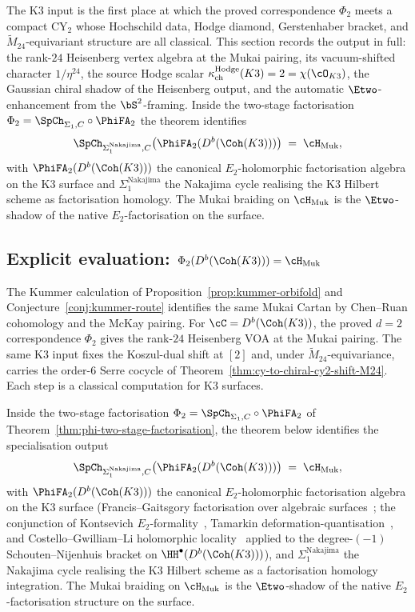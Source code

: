 The K3 input is the first place at which the proved correspondence $\Phi_2$ meets a compact CY$_2$ whose Hochschild data, Hodge diamond, Gerstenhaber bracket, and $\widetilde{M}_{24}$-equivariant structure are all classical. This section records the output in full: the rank-$24$ Heisenberg vertex algebra at the Mukai pairing, its vacuum-shifted character $1/\eta^{24}$, the source Hodge scalar $\kappa_{\mathrm{ch}}^{\mathrm{Hodge}}(K3) = 2 = \chi(\cO_{K3})$, the Gaussian chiral shadow of the Heisenberg output, and the automatic $\Etwo$-enhancement from the $\bS^2$-framing. Inside the two-stage factorisation $\Phi_2 = \SpCh_{\Sigma_1, C} \circ \PhiFA_2$ the theorem identifies
\[
 \SpCh_{\Sigma_1^{\mathrm{Nakajima}}, C}\bigl(\PhiFA_2(D^b(\Coh(K3)))\bigr) \;=\; \cH_{\mathrm{Muk}},
\]
with $\PhiFA_2(D^b(\Coh(K3)))$ the canonical $E_2$-holomorphic factorisation algebra on the K3 surface and $\Sigma_1^{\mathrm{Nakajima}}$ the Nakajima cycle realising the K3 Hilbert scheme as factorisation homology. The Mukai braiding on $\cH_{\mathrm{Muk}}$ is the $\Etwo$-shadow of the native $E_2$-factorisation on the surface.

\subsection{Explicit evaluation: \texorpdfstring{$\Phi_2(D^b(\Coh(K3))) = \cH_{\mathrm{Muk}}$}{Phi-2(D-b(Coh(K3))) = H-Muk}}
\label{subsec:phi-k3-explicit}

The Kummer calculation of Proposition~\ref{prop:kummer-orbifold} and
Conjecture~\ref{conj:kummer-route} identifies the same Mukai Cartan by
Chen--Ruan cohomology and the McKay pairing.  For
\(\cC = D^b(\Coh(K3))\), the proved \(d=2\) correspondence
\(\Phi_2\) gives the rank-\(24\) Heisenberg VOA at the Mukai pairing.
The same K3 input fixes the Koszul-dual shift at \([2]\) and, under
\(\widetilde{M}_{24}\)-equivariance, carries the order-\(6\) Serre
cocycle of Theorem~\ref{thm:cy-to-chiral-cy2-shift-M24}.  Each step is
a classical computation for K3 surfaces.

Inside the two-stage factorisation $\Phi_2 = \SpCh_{\Sigma_1, C} \circ \PhiFA_2$ of Theorem~\ref{thm:phi-two-stage-factorisation}, the theorem below identifies the specialisation output
\[
 \SpCh_{\Sigma_1^{\mathrm{Nakajima}}, C}\bigl(\PhiFA_2(D^b(\Coh(K3)))\bigr) \;=\; \cH_{\mathrm{Muk}},
\]
with $\PhiFA_2(D^b(\Coh(K3)))$ the canonical $E_2$-holomorphic factorisation algebra on the K3 surface (Francis--Gaitsgory factorisation over algebraic surfaces~\cite{FrancisGaitsgory2012}; the conjunction of Kontsevich $E_2$-formality~\cite{Kontsevich1999}, Tamarkin deformation-quantisation~\cite{Tamarkin2007}, and Costello--Gwilliam--Li holomorphic locality~\cite{CostelloGwilliam2017,CostelloLi2016,CostelloLi2020} applied to the degree-$(-1)$ Schouten--Nijenhuis bracket on $\HH^\bullet(D^b(\Coh(K3)))$), and $\Sigma_1^{\mathrm{Nakajima}}$ the Nakajima cycle realising the K3 Hilbert scheme as a factorisation homology integration. The Mukai braiding on $\cH_{\mathrm{Muk}}$ is the $\Etwo$-shadow of the native $E_2$-factorisation structure on the surface.

